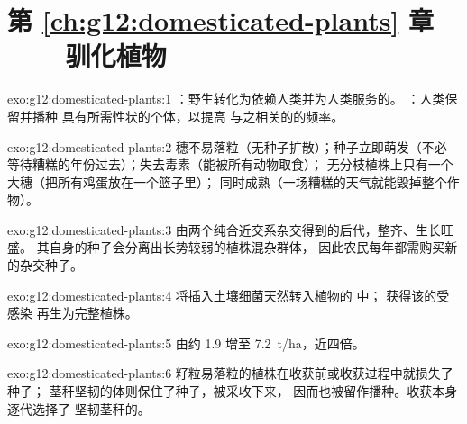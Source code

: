 \section*{第 \ref{ch:g12:domesticated-plants} 章——驯化植物}

\begin{solution}{exo:g12:domesticated-plants:1}
：野生转化为依赖人类并为人类服务的。
：人类保留并播种
具有所需性状的个体，以提高
与之相关的的频率。
\end{solution}

\begin{solution}{exo:g12:domesticated-plants:2}
穗不易落粒（无种子扩散）；种子立即萌发（不必
等待糟糕的年份过去）；失去毒素（能被所有动物取食）；
无分枝植株上只有一个大穗（把所有鸡蛋放在一个篮子里）；
同时成熟（一场糟糕的天气就能毁掉整个作物）。
\end{solution}

\begin{solution}{exo:g12:domesticated-plants:3}
由两个纯合近交系杂交得到的后代，整齐、生长旺盛。
其自身的种子会分离出长势较弱的植株混杂群体，
因此农民每年都需购买新的杂交种子。
\end{solution}

\begin{solution}{exo:g12:domesticated-plants:4}
将插入土壤细菌天然转入植物的  中；
获得该的受感染
再生为完整植株。
\end{solution}

\begin{solution}{exo:g12:domesticated-plants:5}
由约 \num{1.9} 增至 \qty{7.2}{t/ha}，近四倍。
\end{solution}

\begin{solution}{exo:g12:domesticated-plants:6}
籽粒易落粒的植株在收获前或收获过程中就损失了种子；
茎秆坚韧的体则保住了种子，被采收下来，
因而也被留作播种。收获本身逐代选择了
坚韧茎秆的。
\end{solution}

